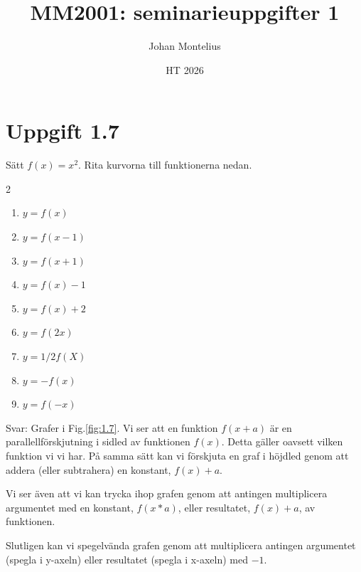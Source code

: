 \documentclass[a4paper, 11pt]{article}
\begin{document}
\title{
    \textbf{MM2001: seminarieuppgifter 1}
}
\author{Johan Montelius}
\date{HT 2026}

\maketitle



\section*{Uppgift 1.7}

Sätt $f(x) = x^2$. Rita kurvorna till funktionerna nedan.

\begin{multicols}{2}
  \begin{enumerate}[label=\alph*)]
  \item $y = f(x)$
  \item $y = f(x-1)$
  \item $y = f(x+1)$
  \item $y = f(x) - 1 $
  \item $y = f(x) + 2 $
  \item $y = f(2x) $
  \item $y = 1/2 f(X) $
  \item $y = -f(x) $
  \item $y = f(-x) $
  \end{enumerate}
\end{multicols}

\noindent Svar: Grafer i Fig.\ref{fig:1.7}. Vi ser att en funktion $f(x+a)$ är
  en parallellförskjutning i sidled av funktionen $f(x)$. Detta gäller
  oavsett vilken funktion vi vi har. På samma sätt kan vi förskjuta en
  graf i höjdled genom att addera (eller subtrahera) en konstant,
  $f(x)+a$.

  Vi ser även att vi kan trycka ihop grafen genom att antingen
  multiplicera argumentet med en konstant, $f(x*a)$, eller resultatet,
  $f(x) + a$, av funktionen.

  Slutligen kan vi spegelvända grafen genom att multiplicera antingen
  argumentet (spegla i y-axeln) eller resultatet (spegla i x-axeln) med $-1$. 
  
\end{document}
